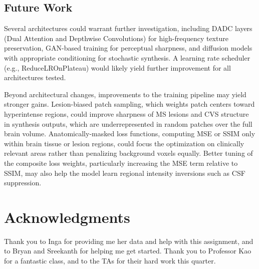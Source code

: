 \documentclass{article}
\begin{document}
\subsection{Future Work}

Several architectures could warrant further investigation, including DADC
layers (Dual Attention and Depthwise Convolutions) for high-frequency texture
preservation, GAN-based training for perceptual sharpness, and diffusion
models with appropriate conditioning for stochastic synthesis. A learning rate
scheduler (e.g., ReduceLROnPlateau) would likely yield further improvement for
all architectures tested.

Beyond architectural changes, improvements to the training pipeline may yield
stronger gains. Lesion-biased patch sampling, which weights patch centers
toward hyperintense regions, could improve sharpness of MS lesions and CVS
structure in synthesis outputs, which are underrepresented in random patches
over the full brain volume. Anatomically-masked loss functions, computing MSE
or SSIM only within brain tissue or lesion regions, could focus the
optimization on clinically relevant areas rather than penalizing background
voxels equally. Better tuning of the composite loss weights, particularly
increasing the MSE term relative to SSIM, may also help the model learn
regional intensity inversions such as CSF suppression.

\section*{Acknowledgments}

Thank you to Inga for providing me her data and help with this assignment, and to Bryan and Sreekanth for helping me get started.
Thank you to Professor Kao for a fantastic class, and to the TAs for their hard work this quarter.

{\small


}
\end{document}
